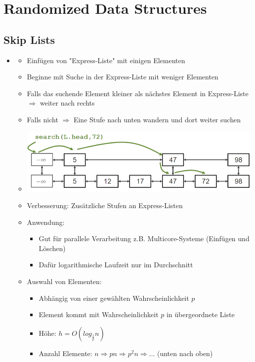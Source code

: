 \documentclass[
    12pt,
    a4paper,
    ngerman,
    color=3b,%
    marginpar=false,
    colorback=false,
    leqno,
]{tudaexercise}
\begin{document}
\section{Randomized Data Structures}\label{Randomized Data Structures}
\subsection{Skip Lists}\label{Skip Lists}
    \begin{itemize}
        \item {}
            \begin{itemize}
                \item Einfügen von \string"Express-Liste\string" mit einigen Elementen
                \item Beginne mit Suche in der Express-Liste mit weniger Elementen
                \item Falls das suchende Element kleiner als nächstes Element in Express-Liste $\Rightarrow$ weiter nach rechts
                \item Falls nicht $\Rightarrow$ Eine Stufe nach unten wandern und dort weiter suchen
                \item[] \includegraphics[width=12cm]{pictures/skiplistSuche.PNG}
                \item Verbesserung: Zusätzliche Stufen an Express-Listen 
                \item Anwendung: 
                \begin{itemize}
                    \item Gut für parallele Verarbeitung z.B. Multicore-Systeme (Einfügen und Löschen)
                    \item Dafür logarithmische Laufzeit nur im Durchschnitt
                \end{itemize}
                \item Auswahl von Elementen:
                    \begin{itemize}
                        \item Abhängig von einer gewählten Wahrscheinlichkeit $p$ 
                        \item Element kommt mit Wahrscheinlichkeit $p$ in übergeordnete Liste
                        \item Höhe: $h = O(log_{\frac{1}{p}}n)$
                        \item Anzahl Elemente: $n \Rightarrow pn \Rightarrow p^2n \Rightarrow ...$ (unten nach oben)
                    \end{itemize}
            \end{itemize}


\end{itemize}
\end{document}
